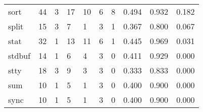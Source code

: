 \begin{longtable}{lp{2.0cm}p{2.0cm}p{2.0cm}p{2.0cm}p{2.0cm}p{2.0cm}p{2.0cm}p{2.0cm}p{2.0cm}}
sort      &                     44 &                                             3 &                                           17 &                                          10 &                                            6 &                                          8 &                                0.494 &                                  0.932 &                                0.182 \\
split     &                     15 &                                             3 &                                            7 &                                           1 &                                            3 &                                          1 &                                0.367 &                                  0.800 &                                0.067 \\
stat      &                     32 &                                             1 &                                           13 &                                          11 &                                            6 &                                          1 &                                0.445 &                                  0.969 &                                0.031 \\
stdbuf    &                     14 &                                             1 &                                            6 &                                           4 &                                            3 &                                          0 &                                0.411 &                                  0.929 &                                0.000 \\
stty      &                     18 &                                             3 &                                            9 &                                           3 &                                            3 &                                          0 &                                0.333 &                                  0.833 &                                0.000 \\
sum       &                     10 &                                             1 &                                            5 &                                           1 &                                            3 &                                          0 &                                0.400 &                                  0.900 &                                0.000 \\
sync      &                     10 &                                             1 &                                            5 &                                           1 &                                            3 &                                          0 &                                0.400 &                                  0.900 &                                0.000 \\

\end{longtable}

